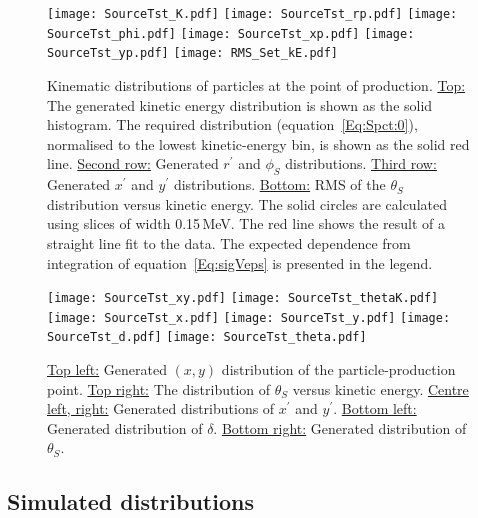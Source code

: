 \begin{figure}
  \begin{center}
    \texttt{[image: SourceTst\_K.pdf]}
    \texttt{[image: SourceTst\_rp.pdf]}
    \texttt{[image: SourceTst\_phi.pdf]}
    \texttt{[image: SourceTst\_xp.pdf]}
    \texttt{[image: SourceTst\_yp.pdf]}
    \texttt{[image: RMS\_Set\_kE.pdf]}
  \end{center}
  \caption{Kinematic distributions of particles at the point of
    production.
    \underline{Top:} The generated kinetic energy distribution is shown
    as the solid histogram. 
    The required distribution (equation~\ref{Eq:Spct:0}), normalised
    to the lowest kinetic-energy bin, is shown as the solid red line.
    \underline{Second row:} Generated $r^\prime$ and $\phi_S$
    distributions. 
    \underline{Third row:} Generated $x^\prime$ and $y^\prime$
    distributions. 
    \underline{Bottom:} RMS of the $\theta_S$ distribution versus
    kinetic energy.
    The solid circles are calculated using slices of width 0.15\,MeV.
    The red line shows the result of a straight line fit to the data.
    The expected dependence from integration of
    equation~\ref{Eq:sigVeps} is presented in the legend.
  }
  \label{Fig:LsrDrvSrc:Dists}
\end{figure}

\begin{figure}
  \begin{center}
    \texttt{[image: SourceTst\_xy.pdf]}
    \texttt{[image: SourceTst\_thetaK.pdf]}
    \texttt{[image: SourceTst\_x.pdf]}
    \texttt{[image: SourceTst\_y.pdf]}
    \texttt{[image: SourceTst\_d.pdf]}
    \texttt{[image: SourceTst\_theta.pdf]}
  \end{center}
  \caption{
    \underline{Top left:} Generated $(x, y)$ distribution of the
    particle-production point.
    \underline{Top right:} The distribution of $\theta_S$ versus
    kinetic energy.
    \underline{Centre left, right:} Generated distributions of
    $x^\prime$ and $y^\prime$.
    \underline{Bottom left:} Generated distribution of $\delta$.
    \underline{Bottom right:} Generated distribution of $\theta_S$.
  }
  \label{Fig:LsrDrvSrc:Dists}
\end{figure}

\subsection{Simulated distributions}

